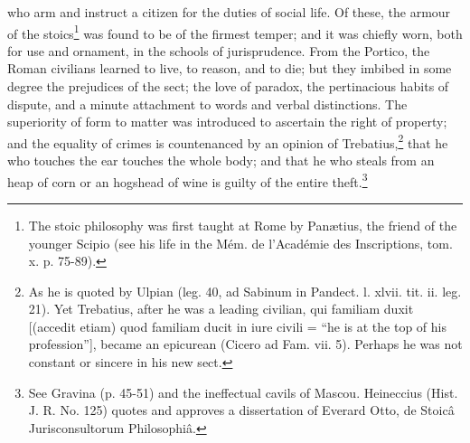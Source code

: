 who arm and instruct a citizen for the duties of social life. Of these, the armour of the stoics\footnote{The stoic philosophy was first taught at Rome by Panætius, the friend of the younger Scipio (see his life in the Mém. de l\texthebrew{}’Académie des Inscriptions, tom. x. p. 75-89).} was found to be of the firmest temper; and it was chiefly worn, both for use and ornament, in the schools of jurisprudence. From the Portico, the Roman civilians learned to live, to reason, and to die; but they imbibed in some degree the prejudices of the sect; the love of paradox, the pertinacious habits of dispute, and a minute attachment to words and verbal distinctions. The superiority of form to matter was introduced to ascertain the right of property; and the equality of crimes is countenanced by an opinion of Trebatius,\footnote{As he is quoted by Ulpian (leg. 40, ad Sabinum in Pandect. l. xlvii. tit. ii. leg. 21). Yet Trebatius, after he was a leading civilian, qui familiam duxit [(accedit etiam) quod familiam ducit in iure civili = \texthebrew{“}he is at the top of his profession\texthebrew{}”], became an epicurean (Cicero ad Fam. vii. 5). Perhaps he was not constant or sincere in his new sect.} that he who touches the ear touches the whole body; and that he who steals from an heap of corn or an hogshead of wine is guilty of the entire theft.\footnote{See Gravina (p. 45-51) and the ineffectual cavils of Mascou. Heineccius (Hist. J. R. No. 125) quotes and approves a dissertation of Everard Otto, de Stoicâ Jurisconsultorum Philosophiâ.}

